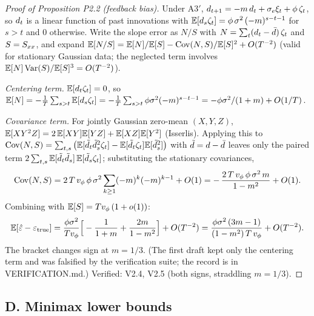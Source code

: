 \documentclass[11pt]{article}
\begin{document}
\begin{proof}[Proof of Proposition P2.2 (feedback bias)]
Under A3$'$, $d_{t+1} = -m\,d_t + \sigma_e \xi_t + \phi\,\zeta_t$, so
$d_t$ is a linear function of past innovations with
$\mathbb{E}[d_s \zeta_t] = \phi\,\sigma^2\,(-m)^{s-t-1}$ for $s > t$ and $0$
otherwise. Write the slope error as $N/S$ with
$N = \sum_t (d_t - \bar{d})\,\zeta_t$ and $S = S_{xx}$, and expand
$\mathbb{E}[N/S] = \mathbb{E}[N]/\mathbb{E}[S] - \operatorname{Cov}(N, S)/\mathbb{E}[S]^2 + O(T^{-2})$ (valid for
stationary Gaussian data; the neglected term involves
$\mathbb{E}[N]\operatorname{Var}(S)/\mathbb{E}[S]^3 = O(T^{-2})$).

\emph{Centering term.} $\mathbb{E}[d_t \zeta_t] = 0$, so
$\mathbb{E}[N] = -\tfrac{1}{T}\sum_{s>t}\mathbb{E}[d_s\zeta_t]
= -\tfrac{1}{T}\sum_{s>t}\phi\sigma^2(-m)^{s-t-1}
= -\phi\sigma^2/(1+m) + O(1/T)$.

\emph{Covariance term.} For jointly Gaussian zero-mean $(X, Y, Z)$,
$\mathbb{E}[XY^2Z] = 2\,\mathbb{E}[XY]\mathbb{E}[YZ] + \mathbb{E}[XZ]\mathbb{E}[Y^2]$ (Isserlis). Applying this to
$\operatorname{Cov}(N, S) = \sum_{t,s}\big(\mathbb{E}[\tilde{d}_t \tilde{d}_s^2 \zeta_t] -
\mathbb{E}[\tilde{d}_t\zeta_t]\mathbb{E}[\tilde{d}_s^2]\big)$ with
$\tilde{d} = d - \bar{d}$ leaves only the paired term
$2\sum_{t,s}\mathbb{E}[\tilde{d}_t\tilde{d}_s]\,\mathbb{E}[\tilde{d}_s\zeta_t]$;
substituting the stationary covariances,
\[
\operatorname{Cov}(N,S) = 2\,T\,v_\phi\,\phi\,\sigma^2 \sum_{k \ge 1} (-m)^{k}(-m)^{k-1}
 + O(1)
 = -\,\frac{2\,T\,v_\phi\,\phi\,\sigma^2\,m}{1-m^2} + O(1).
\]
Combining with $\mathbb{E}[S] = T v_\phi\,(1+o(1))$:
\[
\mathbb{E}[\hat{\varepsilon} - \varepsilon_{\mathrm{true}}]
 = \frac{\phi\sigma^2}{T v_\phi}\Big[-\frac{1}{1+m} + \frac{2m}{1-m^2}\Big]
 + O(T^{-2})
 = \frac{\phi\sigma^2\,(3m-1)}{(1-m^2)\,T\,v_\phi} + O(T^{-2}).
\]
The bracket changes sign at $m = 1/3$. (The first draft kept only the
centering term and was falsified by the verification suite; the record is
in VERIFICATION.md.) Verified: V2.4, V2.5 (both signs, straddling
$m = 1/3$).
\end{proof}

\subsection*{D. Minimax lower bounds}
\end{document}

